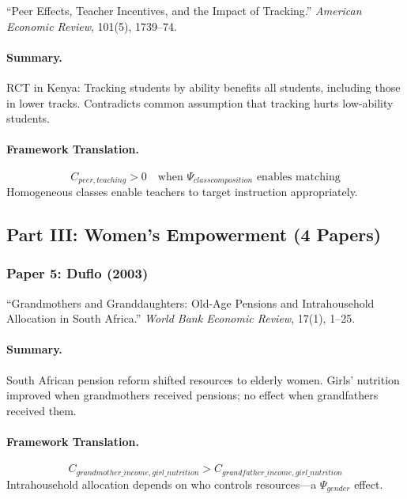 ``Peer Effects, Teacher Incentives, and the Impact of Tracking.''
\textit{American Economic Review}, 101(5), 1739--74.

\paragraph{Summary.}
RCT in Kenya: Tracking students by ability benefits all students, including those
in lower tracks. Contradicts common assumption that tracking hurts low-ability students.

\paragraph{Framework Translation.}
\begin{equation}
  C_{peer, teaching} > 0 \quad \text{when } \Psi_{class composition} \text{ enables matching}
\end{equation}
Homogeneous classes enable teachers to target instruction appropriately.

\subsection{Part III: Women's Empowerment (4 Papers)}

\subsubsection{Paper 5: Duflo (2003)}

``Grandmothers and Granddaughters: Old-Age Pensions and Intrahousehold Allocation in South Africa.''
\textit{World Bank Economic Review}, 17(1), 1--25.

\paragraph{Summary.}
South African pension reform shifted resources to elderly women. Girls' nutrition
improved when grandmothers received pensions; no effect when grandfathers received them.

\paragraph{Framework Translation.}
\begin{equation}
  C_{grandmother\_income, girl\_nutrition} > C_{grandfather\_income, girl\_nutrition}
\end{equation}
Intrahousehold allocation depends on who controls resources---a $\Psi_{gender}$ effect.

